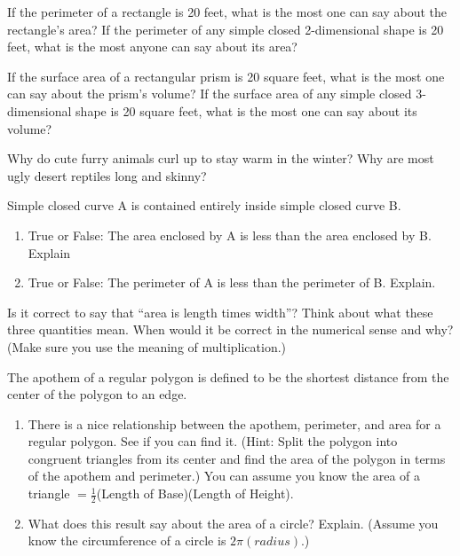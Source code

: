 
\begin{prob}
If the perimeter of a rectangle is 20 feet, what is the most one can say about the rectangle's area?  If the perimeter of any simple closed 2-dimensional shape is 20 feet, what is the most anyone can say about its area?
\end{prob}

\begin{prob}
If the surface area of a rectangular prism is 20 square feet, what is the most one can say about the prism's volume?  If the surface area of any simple closed 3-dimensional shape is 20 square feet, what is the most one can say about its volume? 
\end{prob}

\begin{prob}
Why do cute furry animals curl up to stay warm in the winter?  Why are most ugly desert reptiles long and skinny?
\end{prob}

\begin{prob}Simple closed curve A is contained entirely inside simple closed curve B.  
\begin{enumerate}
\item True or False:  The area enclosed by A is less than the area enclosed by B. Explain
\item True or False:  The perimeter of A is less than the perimeter of B. Explain.  
\end{enumerate}
\end{prob}

\begin{prob}
Is it correct to say that ``area is length times width''?  Think about what these three quantities mean.  When would it be correct in the numerical sense and why?  (Make sure you use the meaning of multiplication.)   
\end{prob}

\begin{prob}
The apothem of a regular polygon is defined to be the shortest distance from the center of the polygon to an edge.
\begin{enumerate}
\item There is a nice relationship between the apothem, perimeter, and area for a regular polygon.  See if you can find it. (Hint:  Split the polygon into congruent triangles from its center and find the area of the polygon in terms of the apothem and perimeter.)  You can assume you know the area of a triangle $=\frac{1}{2}$(Length of Base)(Length of Height).
\item What does this result say about the area of a circle?  Explain. (Assume you know the circumference of a circle is $2\pi(radius)$.)
\end{enumerate}
\end{prob}

